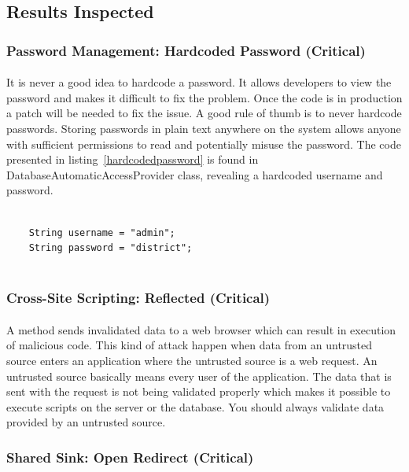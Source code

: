 \documentclass[11pt,english,a4paper]{report}
\begin{document}
\subsection{Results Inspected}
\subsubsection{Password Management: Hardcoded Password (Critical)}
\paragraph{}
It is never a good idea to hardcode a password.
It allows developers to view the password and makes it difficult to fix the problem. 
Once the code is in production a patch will be needed to fix the issue.
A good rule of thumb is to never hardcode passwords.
Storing passwords in plain text anywhere on the system allows anyone with sufficient permissions to read and potentially misuse the password.
The code presented in listing~\ref{hardcodedpassword} is found in DatabaseAutomaticAccessProvider class, revealing a hardcoded username and password.

\begin{lstlisting}[caption=Hardcoded username and password, label=hardcodedpassword]

	String username = "admin";
	String password = "district";
	
\end{lstlisting}


\subsubsection{Cross-Site Scripting: Reflected (Critical)}
\paragraph{}
A method sends invalidated data to a web browser which can result in execution of malicious code.
This kind of attack happen when data from an untrusted source enters an application where the untrusted source is a web request.
An untrusted source basically means every user of the application.
The data that is sent with the request is not being validated properly which makes it possible to execute scripts on the server or the database.
You should always validate data provided by an untrusted source.


\subsubsection{Shared Sink: Open Redirect (Critical)}
\end{document}
